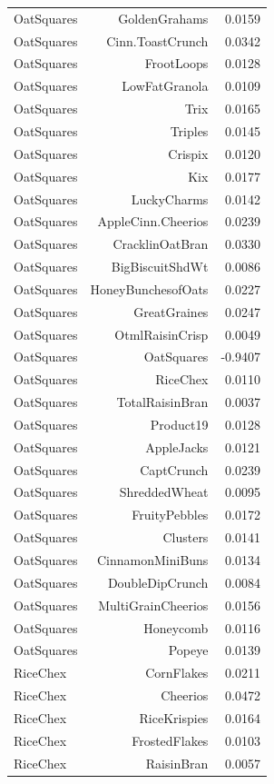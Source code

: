\begin{longtable}{@{}lrr@{}}
OatSquares & GoldenGrahams & 0.0159 \\
OatSquares & Cinn.ToastCrunch & 0.0342 \\
OatSquares & FrootLoops & 0.0128 \\
OatSquares & LowFatGranola & 0.0109 \\
OatSquares & Trix & 0.0165 \\
OatSquares & Triples & 0.0145 \\
OatSquares & Crispix & 0.0120 \\
OatSquares & Kix & 0.0177 \\
OatSquares & LuckyCharms & 0.0142 \\
OatSquares & AppleCinn.Cheerios & 0.0239 \\
OatSquares & CracklinOatBran & 0.0330 \\
OatSquares & BigBiscuitShdWt & 0.0086 \\
OatSquares & HoneyBunchesofOats & 0.0227 \\
OatSquares & GreatGraines & 0.0247 \\
OatSquares & OtmlRaisinCrisp & 0.0049 \\
OatSquares & OatSquares & -0.9407 \\
OatSquares & RiceChex & 0.0110 \\
OatSquares & TotalRaisinBran & 0.0037 \\
OatSquares & Product19 & 0.0128 \\
OatSquares & AppleJacks & 0.0121 \\
OatSquares & CaptCrunch & 0.0239 \\
OatSquares & ShreddedWheat & 0.0095 \\
OatSquares & FruityPebbles & 0.0172 \\
OatSquares & Clusters & 0.0141 \\
OatSquares & CinnamonMiniBuns & 0.0134 \\
OatSquares & DoubleDipCrunch & 0.0084 \\
OatSquares & MultiGrainCheerios & 0.0156 \\
OatSquares & Honeycomb & 0.0116 \\
OatSquares & Popeye & 0.0139 \\
RiceChex & CornFlakes & 0.0211 \\
RiceChex & Cheerios & 0.0472 \\
RiceChex & RiceKrispies & 0.0164 \\
RiceChex & FrostedFlakes & 0.0103 \\
RiceChex & RaisinBran & 0.0057 \\

\end{longtable}
